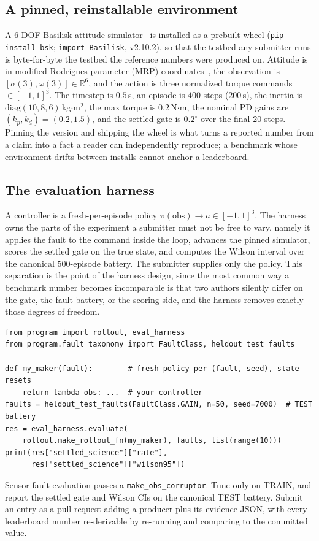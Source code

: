 \documentclass[11pt]{article}
\begin{document}
\subsection{A pinned, reinstallable environment} \begin{sloppypar}A 6-DOF Basilisk attitude
simulator~\cite{Basilisk} is installed as a prebuilt wheel (\texttt{pip install bsk};
\texttt{import Basilisk}, v2.10.2), so that the testbed any submitter runs is byte-for-byte the
testbed the reference numbers were produced on. Attitude is in modified-Rodrigues-parameter (MRP)
coordinates~\cite{Schaub2018}, the observation is $[\sigma(3),\omega(3)]\in\mathbb{R}^6$, and the
action is three normalized torque commands $\in[-1,1]^3$. The timestep is $0.5$\,s, an episode is
$400$ steps ($200$\,s), the inertia is $\mathrm{diag}(10,8,6)$\,kg$\cdot$m$^2$, the max torque is
$0.2$\,N$\cdot$m, the nominal PD gains are $(k_p,k_d){=}(0.2,1.5)$, and the settled gate is
$0.2^\circ$ over the final $20$ steps. Pinning the version and shipping the wheel is what turns a
reported number from a claim into a fact a reader can independently reproduce; a benchmark whose
environment drifts between installs cannot anchor a leaderboard.\end{sloppypar}

\subsection{The evaluation harness} A controller is a fresh-per-episode policy
$\pi(\mathrm{obs})\!\to\!a\in[-1,1]^3$. The harness owns the parts of the experiment a submitter must
not be free to vary, namely it applies the fault to the command inside the loop, advances the pinned
simulator, scores the settled gate on the true state, and computes the Wilson interval over the
canonical $500$-episode battery. The submitter supplies only the policy. This separation is the point
of the harness design, since the most common way a benchmark number becomes incomparable is that two
authors silently differ on the gate, the fault battery, or the scoring side, and the harness removes
exactly those degrees of freedom.
\begin{lstlisting}
from program import rollout, eval_harness
from program.fault_taxonomy import FaultClass, heldout_test_faults

def my_maker(fault):        # fresh policy per (fault, seed), state resets
    return lambda obs: ...  # your controller
faults = heldout_test_faults(FaultClass.GAIN, n=50, seed=7000)  # TEST battery
res = eval_harness.evaluate(
    rollout.make_rollout_fn(my_maker), faults, list(range(10)))
print(res["settled_science"]["rate"],
      res["settled_science"]["wilson95"])
\end{lstlisting}
Sensor-fault evaluation passes a \texttt{make\_obs\_corruptor}. Tune only on TRAIN, and report the
settled gate and Wilson CIs on the canonical TEST battery. Submit an entry as a pull request adding
a producer plus its evidence JSON, with every leaderboard number re-derivable by re-running and
comparing to the committed value.
\end{document}
